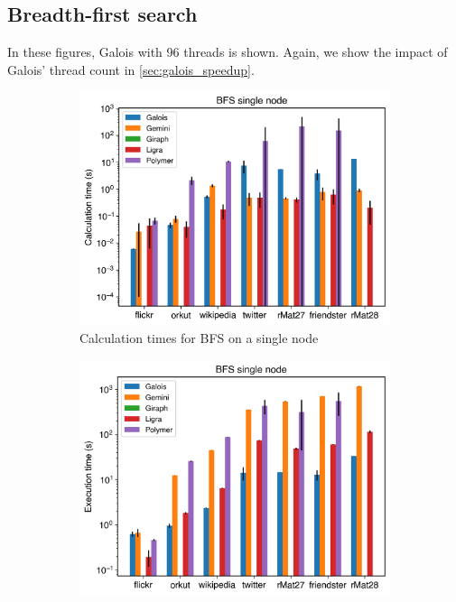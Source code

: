 
\subsection{Breadth-first search}
In these figures, Galois with 96 threads is shown. Again, we show the impact of Galois' thread count in \autoref{sec:galois_speedup}.
\begin{figure}
	\begin{subfigure}{0.3\textwidth}
		\includegraphics[width=\linewidth]{../../plots/singleNodeBFS_calcTime.png}
		\caption{Calculation times for BFS on a single node}
		\label{fig:singleNodeBFS_calc}
	\end{subfigure}
	\hfil
	\begin{subfigure}{0.3\textwidth}
		\includegraphics[width=\linewidth]{../../plots/singleNodeBFS_execTime.png}

\end{subfigure}
\end{figure}
